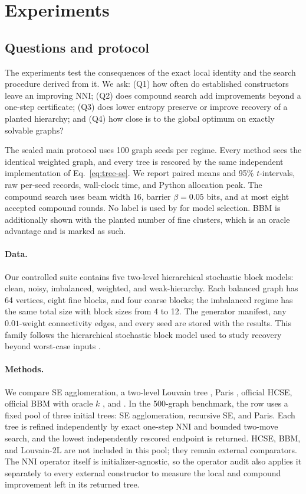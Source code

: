 \section{Experiments}\label{sec:experiments}
\subsection{Questions and protocol}
The experiments test the consequences of the exact local identity and the
search procedure derived from it. We ask: (Q1) how often do established
constructors leave an improving NNI;
(Q2) does compound search add improvements beyond a one-step certificate;
(Q3) does lower entropy preserve or improve recovery of a planted hierarchy;
and (Q4) how close is \NEST to the global optimum on exactly solvable graphs?

The sealed main protocol uses 100 graph seeds per regime. Every method sees the
identical weighted graph, and every tree is rescored by the same independent
implementation of Eq.~\eqref{eq:tree-se}. We report paired means and 95\%
$t$-intervals, raw per-seed records, wall-clock time, and Python allocation
peak. The compound search uses beam width 16, barrier $\beta=0.05$ bits, and at
most eight accepted compound rounds. No label is used by \NEST for model
selection. BBM is additionally shown with the planted number of fine clusters,
which is an oracle advantage and is marked as such.

\paragraph{Data.}
Our controlled suite contains five two-level hierarchical stochastic block
models: clean, noisy, imbalanced, weighted, and weak-hierarchy. Each balanced
graph has 64 vertices, eight fine blocks, and four coarse blocks; the
imbalanced regime has the same total size with block sizes from 4 to 12. The
generator manifest, any $0.01$-weight connectivity edges, and every seed are
stored with the results. This family follows the hierarchical stochastic block
model used to study recovery beyond worst-case inputs \cite{cohenaddad2017hsbm}.

\paragraph{Methods.}
We compare SE agglomeration, a two-level Louvain tree \cite{blondel2008}, Paris
\cite{bonald2018paris}, official HCSE, official BBM with oracle $k$
\cite{pan2025}, and \NEST. In the 500-graph benchmark, the \NEST row uses a
fixed pool of three initial trees: SE agglomeration, recursive SE, and Paris.
Each tree is refined independently by exact one-step NNI and bounded two-move
search, and the lowest independently rescored endpoint is returned. HCSE, BBM,
and Louvain-2L are not included in this pool; they remain external comparators.
The NNI operator itself is initializer-agnostic, so the operator audit also
applies it separately to every external constructor to measure the local and
compound improvement left in its returned tree.

